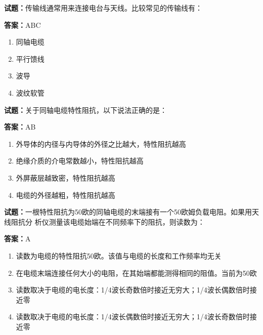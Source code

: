 \documentclass{ctexbook}
\begin{document}




\vspace{1em}

\textbf{试题：}传输线通常用来连接电台与天线。比较常见的传输线有： 

\textbf{答案：}ABC 

\begin{enumerate}[leftmargin=3em]
  \item 同轴电缆 

  \item 平行馈线 

  \item 波导 

  \item 波纹软管 

\end{enumerate}





\vspace{1em}

\textbf{试题：}关于同轴电缆特性阻抗，以下说法正确的是： 

\textbf{答案：}AB 

\begin{enumerate}[leftmargin=3em]
  \item 外导体的内径与内导体的外径之比越大，特性阻抗越高 

  \item 绝缘介质的介电常数越小，特性阻抗越高 

  \item 外屏蔽层越致密，特性阻抗越高 

  \item 电缆的外径越粗，特性阻抗越高 

\end{enumerate}





\vspace{1em}

\textbf{试题：}一根特性阻抗为50欧的同轴电缆的末端接有一个50欧姆负载电阻。如果用天线阻抗分
析仪测量该电缆始端在不同频率下的阻抗，则读数为： 

\textbf{答案：}A 

\begin{enumerate}[leftmargin=3em]
  \item 读数为电缆的特性阻抗50欧。该值与电缆的长度和工作频率均无关 

  \item 在电缆末端连接任何大小的电阻，在其始端都能测得相同的阻值。当前为50欧 

  \item 读数取决于电缆的电长度：1/4波长奇数倍时接近无穷大；1/4波长偶数倍时接近零 

  \item 读数取决于电缆的电长度：1/4波长偶数倍时接近无穷大；1/4波长奇数倍时接近零 

\end{enumerate}
\end{document}
